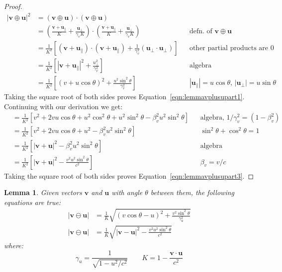 \documentclass[a4paper]{article}
\theoremstyle{plain}
\newtheorem{lemma}[theorem]{Lemma}
\theoremstyle{definition}
\newcommand{\vect}[1]{\mathbf{#1}}
\begin{document}
\begin{proof}
\begin{align*}
|\vect{v} \oplus \vect{u}|^2
  & = (\vect{v} \oplus \vect{u}) \cdot (\vect{v} \oplus \vect{u}) \\
  & = (\frac{ \vect{v} + \vect{u}_{\parallel} }{K} + \frac{\vect{u}_{\perp}}{\gamma_v K}) \cdot (\frac{ \vect{v} + \vect{u}_{\parallel} }{K} + \frac{\vect{u}_{\perp}}{\gamma_v K}) & & \text{defn. of $\vect{v} \oplus \vect{u}$} \\
  & = \frac{1}{K^2} \left[ (\vect{v} + \vect{u}_{\parallel}) \cdot (\vect{v} + \vect{u}_{\parallel}) + \frac{1}{\gamma_v^2} (\vect{u}_{\perp} \cdot \vect{u}_{\perp}) \right] & & \text{other partial products are 0} \\
  & = \frac{1}{K^2} \left[ |\vect{v} + \vect{u}_{\parallel}|^2 + \frac{u_{\perp}^2}{\gamma_v^2} \right] & & \text{algebra} \\
  & = \frac{1}{K^2} \left[ (v + u \cos \theta)^2 + \frac{u^2 \sin^2 \theta}{\gamma_v^2} \right] & & \text{$|\vect{u}_{\parallel}| = u \cos \theta$, $|\vect{u}_{\perp}| = u \sin \theta$}
\end{align*}
Taking the square root of both sides proves
Equation~\eqref{eqn:lemmavplusupart1}.
Continuing with our derivation we get:
\begin{align*}
  & = \frac{1}{K^2} \left[ v^2 + 2vu \cos \theta + u^2 \cos^2 \theta + u^2 \sin^2 \theta - \beta_v^2 u^2 \sin^2 \theta \right] & & \text{algebra, $1/\gamma_v^2 = (1-\beta_v^2)$} \\
  & = \frac{1}{K^2} \left[ v^2 + 2vu \cos \theta + u^2 - \beta_v^2 u^2 \sin^2 \theta \right] & & \text{$\sin^2 \theta + \cos^2 \theta = 1$} \\
  & = \frac{1}{K^2} \left[ |\vect{v} + \vect{u}|^2 - \beta_v^2 u^2 \sin^2 \theta \right] & & \text{algebra} \\
  & = \frac{1}{K^2} \left[ |\vect{v} + \vect{u}|^2 - \frac{v^2 u^2 \sin^2 \theta}{c^2} \right] & & \text{$\beta_v = v/c$}
\end{align*}
Taking the square root of both sides proves
Equation~\eqref{eqn:lemmavplusupart3}.
\end{proof}

\begin{lemma}
\label{lem:magnitudeRelVecMinus1}
Given vectors $\vect{v}$ and $\vect{u}$
with angle $\theta$ between them,
the following equations are true:
\begin{align}
|\vect{v} \ominus \vect{u}|
  & = \frac{1}{K} \sqrt{(v \cos \theta - u)^2 + \frac{v^2 \sin^2 \theta}{\gamma_u^2}} \label{eqn:lemmavminusupart1} \\
|\vect{v} \ominus \vect{u}|
  & = \frac{1}{K} \sqrt{|\vect{v} - \vect{u}|^2 - \frac{v^2 u^2 \sin^2 \theta}{c^2}} \label{eqn:lemmavminusupart3}
\end{align}
where:
\begin{equation}
\gamma_u = \frac{1}{\sqrt{1-u^2/c^2}}  \qquad
K = 1 - \frac{\vect{v} \cdot \vect{u}}{c^2} \nonumber
\end{equation}
\end{lemma}
\end{document}
